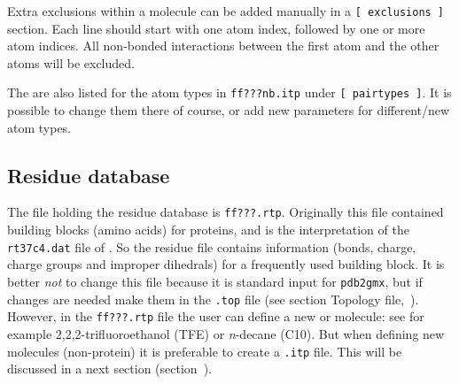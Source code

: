 Extra exclusions within a molecule can be added manually
in a {\tt [~exclusions~]} section. Each line should start with one
atom index, followed by one or more atom indices. All non-bonded
interactions between the first atom and the other atoms will be excluded.

The  are also listed for the atom types
in {\tt ff???nb.itp} under {\tt [~pairtypes~]}. It is possible to
change them there of course, or add new parameters for different/new
atom types.

\subsection{Residue database}
\label{subsec:rtp}
The file holding the residue database is {\tt ff???.rtp}. Originally
this file contained building blocks (amino acids) for proteins, and is
the {\gromacs} interpretation of the {\tt rt37c4.dat} file of {\gromos}. So
the residue file contains information (bonds, charge, charge groups
and improper dihedrals) for a frequently used building block. It is
better {\em not} to change this file because it is standard input for
{\tt pdb2gmx}, but if changes are needed make them in the
{\tt *.top} file (see section Topology file,~). 
However, in the {\tt ff???.rtp} file the user can define a new
 or molecule: see for example 2,2,2-trifluoroethanol
(TFE) or {\em n}-decane (C10). But when defining new molecules
(non-protein) it is preferable to create a {\tt *.itp}
file. This will be discussed in a next section (section~).

